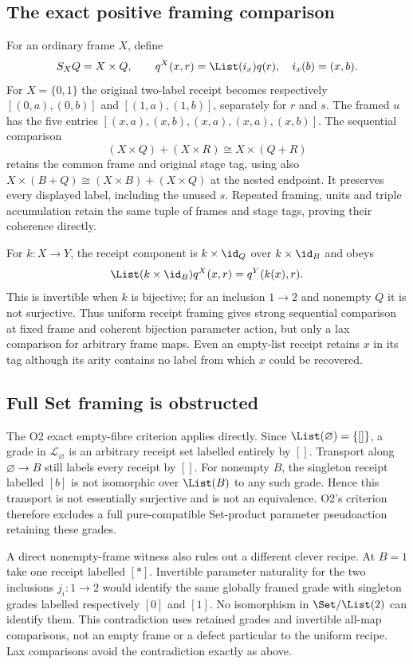 \subsection{The exact positive framing comparison}
For an ordinary frame $X$, define
\[
S_XQ=X\times Q,\qquad q^X(x,r)=\List(i_x)q(r),
\quad i_x(b)=(x,b).
\]
For $X=\{0,1\}$ the original two-label receipt becomes respectively
$[(0,a),(0,b)]$ and $[(1,a),(1,b)]$, separately for $r$ and $s$.
The framed $u$ has the five entries
$[(x,a),(x,b),(x,a),(x,a),(x,b)]$. The sequential comparison
\[
(X\times Q)+(X\times R)\cong X\times(Q+R)
\]
retains the common frame and original stage tag, using also
$X\times(B+Q)\cong(X\times B)+(X\times Q)$ at the nested endpoint.
It preserves every displayed label, including the unused $s$.
Repeated framing, units and triple accumulation retain the same tuple
of frames and stage tags, proving their coherence directly.

For $k:X\to Y$, the receipt component is $k\times\id_Q$ over
$k\times\id_B$ and obeys
\[
\List(k\times\id_B)q^X(x,r)=q^Y(k(x),r).
\]
This is invertible when $k$ is bijective; for an inclusion $1\to2$ and
nonempty $Q$ it is not surjective. Thus uniform receipt framing gives
strong sequential comparison at fixed frame and coherent bijection
parameter action, but only a lax comparison for arbitrary frame maps.
Even an empty-list receipt retains $x$ in its tag although its arity
contains no label from which $x$ could be recovered.

\subsection{Full Set framing is obstructed}
The O2 exact empty-fibre criterion applies directly. Since
$\List(\varnothing)=\{[]\}$, a grade in $\mathcal L_\varnothing$ is
an arbitrary receipt set labelled entirely by $[]$. Transport along
$\varnothing\to B$ still labels every receipt by $[]$. For nonempty
$B$, the singleton receipt labelled $[b]$ is not isomorphic over
$\List(B)$ to any such grade. Hence this transport is not essentially
surjective and is not an equivalence. O2's criterion therefore excludes
a full pure-compatible Set-product parameter pseudoaction retaining
these grades.

A direct nonempty-frame witness also rules out a different clever recipe.
At $B=1$ take one receipt labelled $[*]$. Invertible parameter naturality
for the two inclusions $j_i:1\to2$ would identify the same globally
framed grade with singleton grades labelled respectively $[0]$ and $[1]$.
No isomorphism in $\Set/\List(2)$ can identify them. This contradiction
uses retained grades and invertible all-map comparisons, not an empty
frame or a defect particular to the uniform recipe. Lax comparisons
avoid the contradiction exactly as above.

